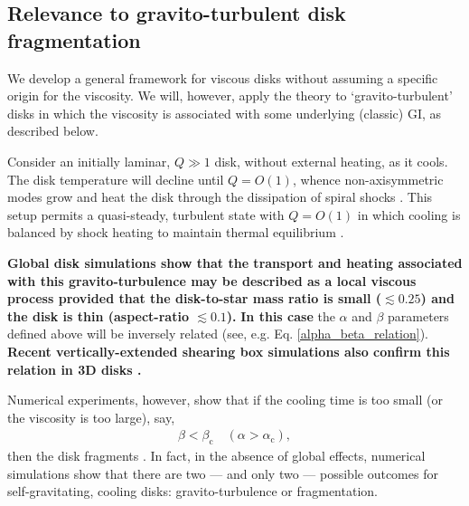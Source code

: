 \documentclass[iop, numberedappendix]{emulateapj}
\begin{document}

\subsection{Relevance to gravito-turbulent disk fragmentation}\label{frag_intro}
We develop a general framework for viscous disks without  
assuming a specific origin for the viscosity. 
We will, however, apply the theory to `gravito-turbulent'
disks in which the viscosity is associated with some underlying
(classic) GI, as described below.  

Consider an initially laminar, $Q\gg1$ disk, without external 
heating, as it cools. The disk temperature will decline
until $Q=O(1)$, whence non-axisymmetric modes grow and heat the disk
through the dissipation of spiral shocks \citep{cossins09}. 
This setup permits a quasi-steady, turbulent state with
$Q =O(1)$ in which cooling is balanced by shock heating to maintain
thermal equilibrium \citep{gammie01}. 

{\bf 
  Global disk simulations \citep[e.g.][]{lodato04} show
  that the transport and 
  heating associated with this gravito-turbulence may be described as a
  local viscous process provided that the disk-to-star mass ratio is
  small ($\lesssim0.25$) and the disk is thin (aspect-ratio $\lesssim
  0.1$).  
}
{\bf In this case} the $\alpha$ and $\beta$ parameters defined above
will be inversely related (see, 
e.g. Eq. \ref{alpha_beta_relation}). {\bf Recent 
  vertically-extended shearing box simulations 
  also confirm this relation in 3D disks \citep{shi14}.} 
   
Numerical experiments, however, show that if the cooling time is too
small (or the viscosity is too large), say,   
\begin{align}\label{frag_cond}
  \beta < \beta_\mathrm{c} \quad
  \left(\alpha>\alpha_\mathrm{c}\right), 
\end{align}
then the disk fragments \citep{gammie01,rice05,rice11}. In fact, in 
the absence of global effects, numerical simulations show that there are
two --- and only two --- possible outcomes for self-gravitating,
cooling disks: gravito-turbulence or fragmentation. 
\end{document}
